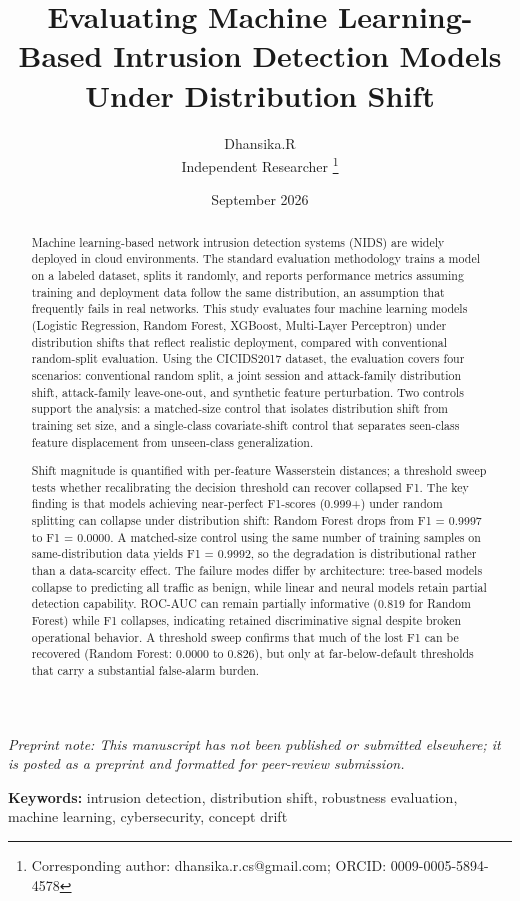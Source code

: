 \documentclass[10pt]{article}
\title{Evaluating Machine Learning-Based Intrusion Detection Models Under Distribution Shift}
\author{Dhansika.R \\ \small Independent Researcher \thanks{Corresponding author: dhansika.r.cs@gmail.com; ORCID: 0009-0005-5894-4578}}
\date{September 2026}
\begin{document}
\maketitle
\noindent\textit{Preprint note: This manuscript has not been published or submitted elsewhere; it is posted as a preprint and formatted for peer-review submission.}\par
\begin{abstract}
Machine learning-based network intrusion detection systems (NIDS) are widely deployed in cloud environments. The standard evaluation methodology trains a model on a labeled dataset, splits it randomly, and reports performance metrics assuming training and deployment data follow the same distribution, an assumption that frequently fails in real networks. This study evaluates four machine learning models (Logistic Regression, Random Forest, XGBoost, Multi-Layer Perceptron) under distribution shifts that reflect realistic deployment, compared with conventional random-split evaluation. Using the CICIDS2017 dataset, the evaluation covers four scenarios: conventional random split, a joint session and attack-family distribution shift, attack-family leave-one-out, and synthetic feature perturbation. Two controls support the analysis: a matched-size control that isolates distribution shift from training set size, and a single-class covariate-shift control that separates seen-class feature displacement from unseen-class generalization.

Shift magnitude is quantified with per-feature Wasserstein distances; a threshold sweep tests whether recalibrating the decision threshold can recover collapsed F1. The key finding is that models achieving near-perfect F1-scores (0.999+) under random splitting can collapse under distribution shift: Random Forest drops from F1 = 0.9997 to F1 = 0.0000. A matched-size control using the same number of training samples on same-distribution data yields F1 = 0.9992, so the degradation is distributional rather than a data-scarcity effect. The failure modes differ by architecture: tree-based models collapse to predicting all traffic as benign, while linear and neural models retain partial detection capability. ROC-AUC can remain partially informative (0.819 for Random Forest) while F1 collapses, indicating retained discriminative signal despite broken operational behavior. A threshold sweep confirms that much of the lost F1 can be recovered (Random Forest: 0.0000 to 0.826), but only at far-below-default thresholds that carry a substantial false-alarm burden.
\end{abstract}
\noindent\textbf{Keywords:} intrusion detection, distribution shift, robustness evaluation, machine learning, cybersecurity, concept drift
\end{document}

